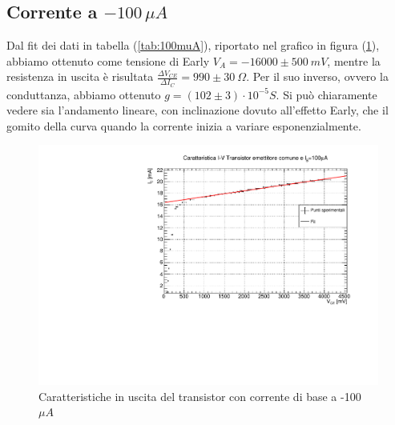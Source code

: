 \documentclass[]{article}
\begin{document}
\subsection{Corrente a $ -100\,\mu A $}
Dal fit dei dati in tabella (\ref{tab:100muA}), riportato nel grafico in figura (\ref{fig:corrente 100}), abbiamo ottenuto come tensione di Early $ V_{A}=-16000\pm500\ mV $, mentre la resistenza in uscita è risultata $ \frac{\Delta V_{CE}}{\Delta I _{C}}=990\pm30\ \Omega$. Per il suo inverso, ovvero la conduttanza, abbiamo ottenuto $ g=(102\pm3)\cdot 10^{-5} S $. Si può chiaramente vedere sia l'andamento lineare, con inclinazione dovuto all'effetto Early, che il gomito della curva quando la corrente inizia a variare esponenzialmente.
	\begin{figure}[H]
		\centering
		\includegraphics[width=0.9\linewidth]{../100 muA/c1}
		\caption{Caratteristiche in uscita del transistor con corrente di base a -100 $ \mu A $}
		\label{fig:corrente 100}
	\end{figure}
\end{document}
